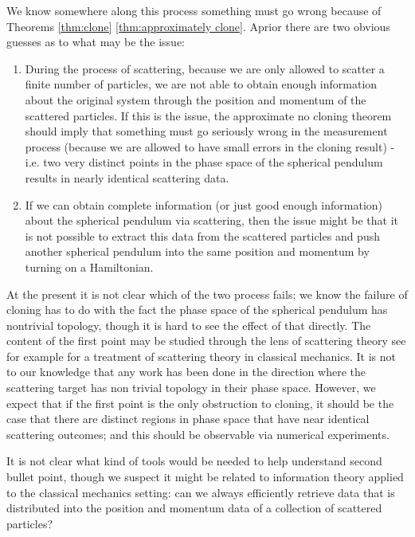 \documentclass[jmp,amsmath,amssymb]{revtex4-1}
\theoremstyle{plain}
\begin{document}
We know somewhere along this process something must go wrong because of Theorems \ref{thm:clone} \ref{thm:approximately clone}. Aprior there are two obvious guesses as to what may be the issue:
\begin{enumerate}
\item During the process of scattering, because we are only allowed to scatter a finite number of particles, we are not able to obtain enough information about the original system through the position and momentum of the scattered particles. If this is the issue, the approximate no cloning theorem should imply that something must go seriously wrong in the measurement process (because we are allowed to have small errors in the cloning result) - i.e. two very distinct points in the phase space of the spherical pendulum results in nearly identical scattering data.
\item If we can obtain complete information (or just good enough information) about the spherical pendulum via scattering, then the issue might be that it is not possible to extract this data from the scattered particles and push another spherical pendulum into the same position and momentum by turning on a Hamiltonian.
\end{enumerate}

At the present it is not clear which of the two process fails; we know the failure of cloning has to do with the fact the phase space of the spherical pendulum has nontrivial topology, though it is hard to see the effect of that directly. The content of the first point may be studied through the lens of scattering theory see for example \cite{Novikov,canonical_scattering_trans_classical_mech,inverse_problems_class_scattering,qual_aspect_class_potential_scatter,S_matrix_in_classical_mech,the_scattering_matrix_and_formulas,time_dependent_scattering} for a treatment of scattering theory in classical mechanics. It is not to our knowledge that any work has been done in the direction where the scattering target has non trivial topology in their phase space. However, we expect that if the first point is the only obstruction to cloning, it should be the case that there are distinct regions in phase space that have near identical scattering outcomes; and this should be observable via numerical experiments.

It is not clear what kind of tools would be needed to help understand second bullet point, though we suspect it might be related to information theory \cite{information_thermo} applied to the classical mechanics setting: can we always efficiently retrieve data that is distributed into the position and momentum data of a collection of scattered particles?
\end{document}
